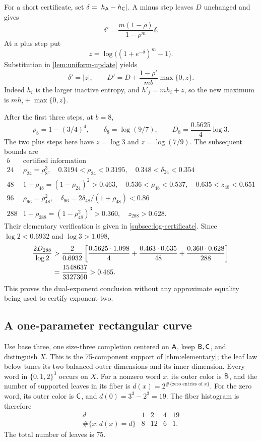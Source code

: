 For a short certificate, set
\(\delta=|h_{\mathsf A}-h_{\mathsf C}|\).
A minus step leaves \(D\) unchanged and gives
\[
 \delta'=\frac{m(1-\rho)}{1-\rho^m}\delta.
\]
At a plus step put
\[
 z=\log\bigl((1+e^{-\delta})^m-1\bigr).
\]
Substitution in \cref{lem:uniform-update} yields
\begin{equation}\label{eq:delta-D}
 \delta'=|z|,\qquad
 D'=D+\frac{1-\rho'}{mb}\max\{0,z\}.
\end{equation}
Indeed \(h_i\) is the larger inactive entropy, and
\(h'_j=mh_i+z\), so the new maximum is
\(mh_i+\max\{0,z\}\).

After the first three steps, at \(b=8\),
\[
 \rho_8=1-(3/4)^4,\qquad
 \delta_8=\log(9/7),\qquad
 D_8=\frac{0.5625}{4}\log3.
\]
The two plus steps here have \(z=\log3\) and \(z=\log(7/9)\).
The subsequent bounds are
\[
\begin{array}{c|l}
 b&\text{certified information}\\ \hline
24&
 \rho_{24}=\rho_8^3,\quad
 0.3194<\rho_{24}<0.3195,\quad
 0.348<\delta_{24}<0.354\\
48&
 1-\rho_{48}=(1-\rho_{24})^2>0.463,\quad
 0.536<\rho_{48}<0.537,\quad 0.635<z_{48}<0.651\\
96&
 \rho_{96}=\rho_{48}^2,\quad
 \delta_{96}=2\delta_{48}/(1+\rho_{48})<0.86\\
288&
 1-\rho_{288}=(1-\rho_{48}^2)^3>0.360,\quad z_{288}>0.628.
\end{array}
\]
Their elementary verification is given in \cref{subsec:log-certificate}.
Since \(\log2<0.6932\) and \(\log3>1.098\),
\begin{align}
 \frac{2D_{288}}{\log2}
 &>
 \frac{2}{0.6932}
 \left[
  \frac{0.5625\cdot1.098}{4}
  +\frac{0.463\cdot0.635}{48}
  +\frac{0.360\cdot0.628}{288}
 \right]\notag\\
 &=\frac{1548637}{3327360}>0.465. \label{eq:alpha-rational}
\end{align}
This proves the dual-exponent conclusion without any approximate
equality being used to certify exponent two.

\subsection{A one-parameter rectangular curve}\label{subsec:curve}

Use base three, one size-three completion centered on \(\mathsf A\),
keep \(\mathsf B,\mathsf C\), and distinguish \(X\).
This is the 75-component support of \cref{thm:elementary}; the leaf
law below tunes its two balanced outer dimensions and its inner dimension.
Every word in \(\{0,1,2\}^3\) occurs on \(X\).
For a nonzero word \(x\), its outer color is \(\mathsf B\), and the number
of supported leaves in its fiber is
\(d(x)=2^{\#\{\text{zero entries of }x\}}\).
For the zero word, its outer color is \(\mathsf C\), and
\(d(0)=3^3-2^3=19\).
The fiber histogram is therefore
\[
\begin{array}{c|rrrr}
 d&1&2&4&19\\ \hline
 \#\{x:d(x)=d\}&8&12&6&1.
\end{array}
\]
The total number of leaves is \(75\).

